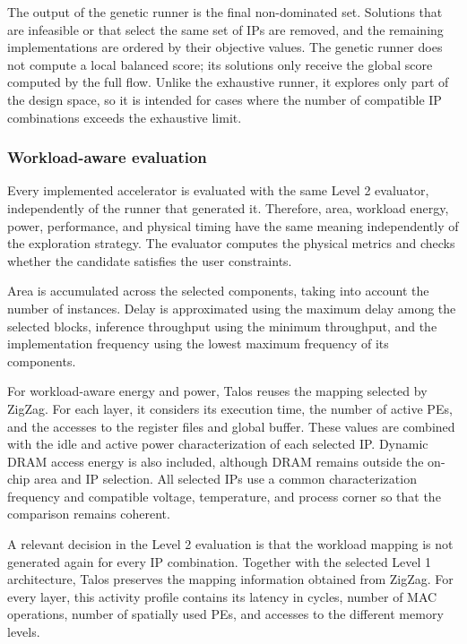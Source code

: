 The output of the genetic runner is the final non-dominated set.
Solutions that are infeasible or that select the same set of IPs are
removed, and the remaining implementations are ordered by their
objective values. The genetic runner does not compute a local balanced
score; its solutions only receive the global score computed by the
full flow. Unlike the exhaustive runner, it explores only part of the
design space, so it is intended for cases where the number of
compatible IP combinations exceeds the exhaustive limit.

\subsubsection{Workload-aware evaluation}
Every implemented accelerator is evaluated with the same Level 2
evaluator, independently of the runner that generated it. Therefore,
area, workload energy, power, performance, and physical timing have
the same meaning independently of the exploration strategy. The
evaluator computes the physical metrics and checks whether the
candidate satisfies the user constraints.

Area is accumulated across the selected components, taking into
account the number of instances. Delay is approximated using the
maximum delay among the selected blocks, inference throughput using the minimum
throughput, and the implementation frequency using the lowest maximum
frequency of its components.

For workload-aware energy and power, Talos reuses the mapping
selected by ZigZag. For each layer, it considers its execution time,
the number of active PEs, and the accesses to the register files and
global buffer. These values are combined with the idle and active
power characterization of each selected IP. Dynamic DRAM access
energy is also included, although DRAM remains outside the on-chip
area and IP selection. All selected IPs use a common characterization
frequency and compatible voltage, temperature, and process corner so
that the comparison remains coherent.

A relevant decision in the Level 2 evaluation is that the workload
mapping is not generated again for every IP combination. Together with
the selected Level 1 architecture, Talos preserves the mapping
information obtained from ZigZag. For every layer, this activity
profile contains its latency in cycles, number of MAC operations,
number of spatially used PEs, and accesses to the different memory
levels.

